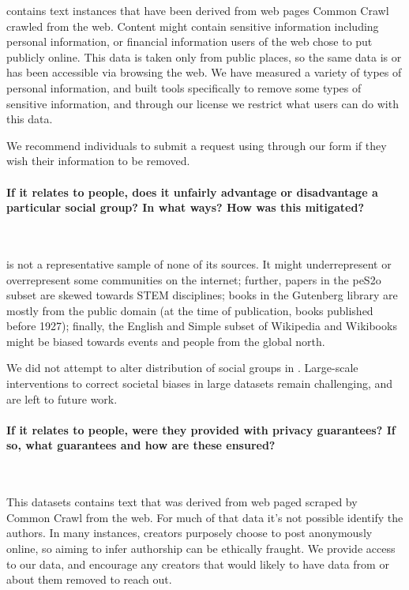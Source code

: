 \dolma contains text instances that have been derived from web pages Common Crawl crawled from the web. 
Content might contain sensitive information including personal information, or financial information users of the web chose to put publicly online. 
This data is taken only from public places, so the same data is or has been accessible via browsing the web. 
We have measured a variety of types of personal information, and built tools specifically to remove some types of sensitive information, and through our license we restrict what users can do with this data. 

We recommend individuals to submit a request using through our form if they wish their information to be removed. 

\paragraph{If it relates to people, does it unfairly advantage or disadvantage a particular social group? In what ways? How was this mitigated?}~

\dolma is not a representative sample of none of its sources. 
It might underrepresent or overrepresent some communities on the internet;
further, papers in the peS2o subset are skewed towards STEM disciplines;
books in the Gutenberg library are mostly from the public domain (at the time of publication, books published before 1927);
finally, the English and Simple subset of Wikipedia and Wikibooks might be biased towards events and people from the global north.

We did not attempt to alter distribution of social groups in \dolma. 
Large-scale interventions to correct societal biases in large datasets remain challenging, and are left to future work.

\paragraph{If it relates to people, were they provided with privacy guarantees? If so, what guarantees and how are these ensured?}~

This datasets contains text that was derived from web paged scraped by Common Crawl from the web. 
For much of that data it’s not possible identify the authors. 
In many instances, creators purposely choose to post anonymously online, so aiming to infer authorship can be ethically fraught. We provide access to our data, and encourage any creators that would likely to have data from or about them removed to reach out.


